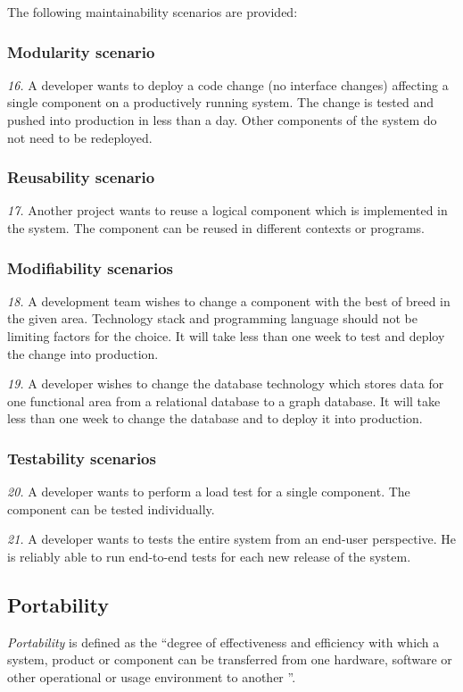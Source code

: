 The following maintainability scenarios are provided:

\subsubsection{Modularity scenario}
\textit{16.}  A developer wants to deploy a code change (no interface changes) affecting a single component on a productively running system. The change is tested and pushed into production in less than a day. Other components of the system do not need to be redeployed.

\subsubsection{Reusability scenario}
\textit{17.} Another project wants to reuse a logical component which is implemented in the system. The component can be reused in different contexts or programs.

\subsubsection{Modifiability scenarios}
\textit{18.} A development team wishes to change a component with the best of breed in the given area. Technology stack and programming language should not be limiting factors for the choice. It will take less than one week to test and deploy the change into production.

\textit{19.} A developer wishes to change the database technology which stores data for one functional area from a relational database to a graph database. It will take less than one week to change the database and to deploy it into production.

\subsubsection{Testability scenarios}
\textit{20.} A developer wants to perform a load test for a single component. The component can be tested individually.

\textit{21.} A developer wants to tests the entire system from an end-user perspective. He is reliably able to run end-to-end tests for each new release of the system.

\subsection*{Portability}
\label{qua:portability}
\textit{Portability} is defined as the ``degree of effectiveness and efficiency with which a system, product or component can be transferred from one hardware, software or other operational or usage environment to another \citep[p. 15]{ISO25010}''.

